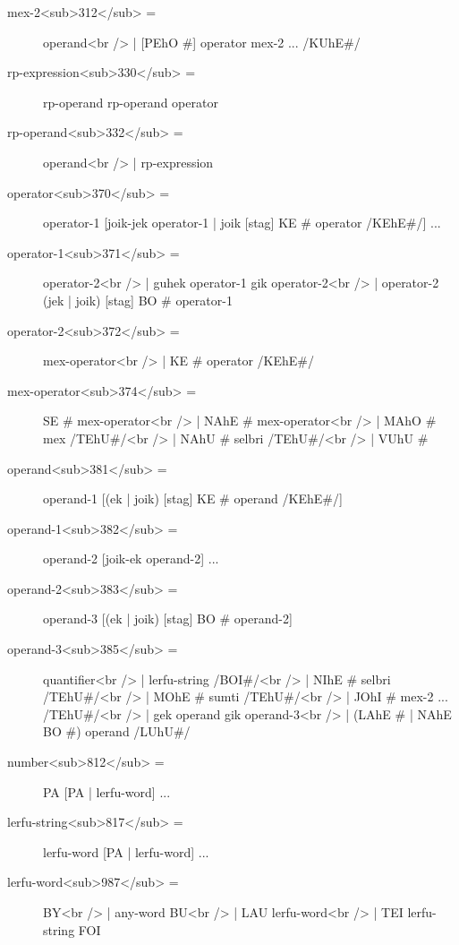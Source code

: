 \begin{description}
\hyperref[html:y312]{}
\item[mex-2<sub>312</sub> =] operand<br /> | [PEhO #] operator mex-2 ... /KUhE#/ \label{html:b330}
\hyperref[html:y330]{}
\item[rp-expression<sub>330</sub> =] rp-operand rp-operand operator \label{html:b332}
\hyperref[html:y332]{}
\item[rp-operand<sub>332</sub> =] operand<br /> | rp-expression \label{html:b370}
\hyperref[html:y370]{}
\item[operator<sub>370</sub> =] operator-1 [joik-jek operator-1 | joik [stag] KE # operator /KEhE#/] ... \label{html:b371}
\hyperref[html:y371]{}
\item[operator-1<sub>371</sub> =] operator-2<br /> | guhek operator-1 gik operator-2<br /> | operator-2 (jek | joik) [stag] BO # operator-1 \label{html:b372}
\hyperref[html:y372]{}
\item[operator-2<sub>372</sub> =] mex-operator<br /> | KE # operator /KEhE#/ \label{html:b374}
\hyperref[html:y374]{}
\item[mex-operator<sub>374</sub> =] SE # mex-operator<br /> | NAhE # mex-operator<br /> | MAhO # mex /TEhU#/<br /> | NAhU # selbri /TEhU#/<br /> | VUhU # \label{html:b381}
\hyperref[html:y381]{}
\item[operand<sub>381</sub> =] operand-1 [(ek | joik) [stag] KE # operand /KEhE#/] \label{html:b382}
\hyperref[html:y382]{}
\item[operand-1<sub>382</sub> =] operand-2 [joik-ek operand-2] ... \label{html:b383}
\hyperref[html:y383]{}
\item[operand-2<sub>383</sub> =] operand-3 [(ek | joik) [stag] BO # operand-2] \label{html:b385}
\hyperref[html:y385]{}
\item[operand-3<sub>385</sub> =] quantifier<br /> | lerfu-string /BOI#/<br /> | NIhE # selbri /TEhU#/<br /> | MOhE # sumti /TEhU#/<br /> | JOhI # mex-2 ... /TEhU#/<br /> | gek operand gik operand-3<br /> | (LAhE # | NAhE BO #) operand /LUhU#/ \label{html:b812}
\hyperref[html:y812]{}
\item[number<sub>812</sub> =] PA [PA | lerfu-word] ... \label{html:b817}
\hyperref[html:y817]{}
\item[lerfu-string<sub>817</sub> =] lerfu-word [PA | lerfu-word] ... \label{html:b987}
\hyperref[html:y987]{}
\item[lerfu-word<sub>987</sub> =] BY<br /> | any-word BU<br /> | LAU lerfu-word<br /> | TEI lerfu-string FOI \label{html:b802}

\end{description}
